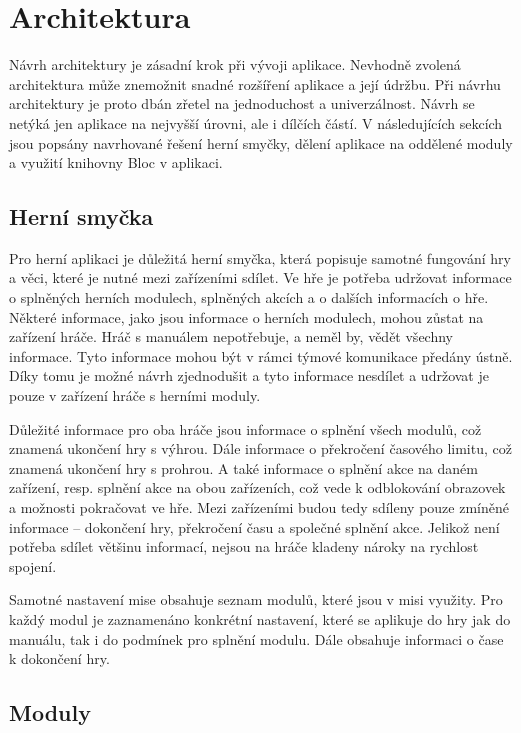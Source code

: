\section{Architektura}

Návrh architektury je zásadní krok při vývoji aplikace.
Nevhodně zvolená architektura může znemožnit snadné rozšíření aplikace
a její údržbu.
Při návrhu architektury je proto dbán zřetel na jednoduchost a univerzálnost.
Návrh se netýká jen aplikace na nejvyšší úrovni,
ale i dílčích částí. 
V následujících sekcích jsou popsány navrhované řešení herní smyčky,
dělení aplikace na oddělené moduly a využití knihovny Bloc v aplikaci.

\subsection{Herní smyčka}

Pro herní aplikaci je důležitá herní smyčka,
která popisuje samotné fungování hry a věci,
které je nutné mezi zařízeními sdílet.
Ve hře je potřeba udržovat informace o splněných herních modulech,
splněných akcích a o dalších informacích o hře.
Některé informace, jako jsou informace o herních modulech,
mohou zůstat na zařízení hráče.
Hráč s manuálem nepotřebuje,
a neměl by,
vědět všechny informace.
Tyto informace mohou být v rámci týmové komunikace předány ústně.
Díky tomu je možné návrh zjednodušit a tyto informace nesdílet
a udržovat je pouze v zařízení hráče s herními moduly.

Důležité informace pro oba hráče jsou informace o splnění všech modulů,
což znamená ukončení hry s výhrou.
Dále informace o překročení časového limitu,
což znamená ukončení hry s prohrou.
A také informace o splnění akce na daném zařízení,
resp. splnění akce na obou zařízeních,
což vede k odblokování obrazovek a možnosti pokračovat ve hře.
Mezi zařízeními budou tedy sdíleny pouze zmíněné informace --
dokončení hry, překročení času a společné splnění akce.
Jelikož není potřeba sdílet většinu informací,
nejsou na hráče kladeny nároky na rychlost spojení.

Samotné nastavení mise obsahuje seznam modulů,
které jsou v misi využity.
Pro každý modul je zaznamenáno konkrétní nastavení,
které se aplikuje do hry jak do manuálu, tak i do podmínek pro splnění modulu.
Dále obsahuje informaci o čase k dokončení hry.

\subsection{Moduly}

